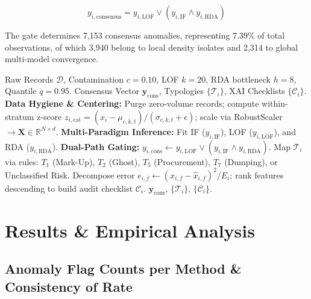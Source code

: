 \documentclass[conference]{IEEEtran}
\begin{document}
\begin{equation}
y_{i, \mathrm{consensus}} = y_{i, \mathrm{LOF}} \lor \left(y_{i, \mathrm{IF}} \land y_{i, \mathrm{RDA}}\right)
\end{equation}

The gate determines 7,153 consensus anomalies, representing 7.39\% of total observations, of which 3,940 belong to local density isolates and 2,314 to global multi-model convergence.

\begin{algorithm}[htbp]
\caption{End-to-End Dual-Path Anomaly Detection \& XAI Pipeline}
\label{alg:end_to_end}
\begin{algorithmic}[1]
\REQUIRE Raw Records $\mathcal{D}$, Contamination $c=0.10$, LOF $k=20$, RDA bottleneck $h=8$, Quantile $q=0.95$.
\ENSURE Consensus Vector $\mathbf{y}_{\text{cons}}$, Typologies $\{\mathcal{T}_i\}$, XAI Checklists $\{\mathcal{C}_i\}$.
\STATE \textbf{Data Hygiene \& Centering:} Purge zero-volume records; compute within-stratum z-score $z_{i, \text{cat}} = (x_i - \mu_{c,k,t})/(\sigma_{c,k,t}+\epsilon)$; scale via RobustScaler $\to \mathbf{X} \in \mathbb{R}^{N \times d}$.
\STATE \textbf{Multi-Paradigm Inference:} Fit IF ($y_{i,\text{IF}}$), LOF ($y_{i,\text{LOF}}$), and RDA ($y_{i,\text{RDA}}$).
\STATE \textbf{Dual-Path Gating:} $y_{i, \text{cons}} \leftarrow y_{i, \text{LOF}} \lor (y_{i, \text{IF}} \land y_{i, \text{RDA}})$.
    \STATE Map $\mathcal{T}_i$ via rules: $T_1$ (Mark-Up), $T_2$ (Ghost), $T_5$ (Procurement), $T_7$ (Dumping), or Unclassified Risk.
    \STATE Decompose error $e_{i,f} \leftarrow (x_{i,f} - \hat{x}_{i,f})^2 / E_i$; rank features descending to build audit checklist $\mathcal{C}_i$.
\ENDFOR
\RETURN $\mathbf{y}_{\text{cons}}$, $\{\mathcal{T}_i\}$, $\{\mathcal{C}_i\}$.
\end{algorithmic}
\end{algorithm}

\section{Results \& Empirical Analysis}

\subsection{Anomaly Flag Counts per Method \& Consistency of Rate}
\end{document}
